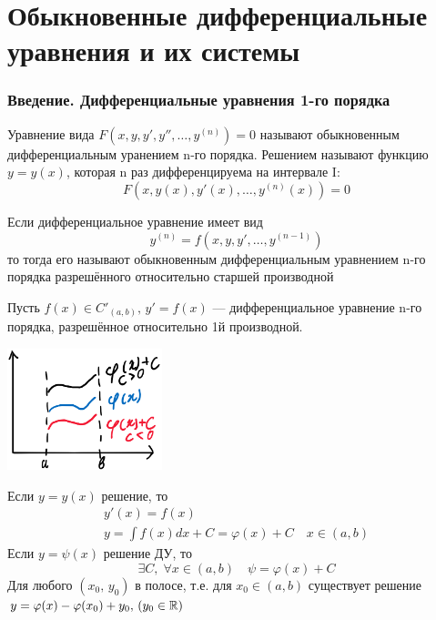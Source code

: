\author{Andrei Tkachuk}

\part{Обыкновенные дифференциальные уравнения и их системы}
\section{Введение. Дифференциальные уравнения 1-го порядка}

\begin{Def}
    Уравнение вида $F(x, y, y', y'', \dots, y^{(n)}) = 0$ называют обыкновенным дифференциальным уранением n-го порядка. Решением называют функцию $y = y(x)$, которая n раз дифференцируема на интервале I: 
    \[
        F(x, y(x), y'(x), \dots, y^{(n)}(x)) = 0
    \]
\end{Def}

\begin{Def}
    Если дифференциальное уравнение имеет вид
    \[
        y^{(n)} = f(x, y, y', \dots, y^{(n - 1)})
    \]
    то тогда его называют обыкновенным дифференциальным уравнением n-го порядка разрешённого относительно старшей производной 
\end{Def}

\begin{Example}[моделный]
    Пусть $f(x) \in C'_{(a, b)}, \, y' = f(x)$ --- дифференциальное уравнение n-го порядка, разрешённое относительно 1й производной.
    \begin{floatingfigure}[l]{50mm}
        \noindent
        \hfil
        \includegraphics[width=45mm]{pictures/2_1_1.png}
        \hfil
    \end{floatingfigure}
    Если $y = y(x)$ решение, то
    \begin{gather*}
        y'(x) = f(x)\\ 
        y = \int{f(x)dx} + C = \varphi(x) + C \quad x \in (a, b)
    \end{gather*}
    Если $y = \psi(x)$ решение ДУ, то 
    \[
        \exists C,\; \forall x \in (a, b) \quad \psi = \varphi(x) + C
    \]
    Для любого $(x_0,\, y_0)$ в полосе, т.е. для $x_0 \in (a, b)$ существует решение $y = \varphi(x) - \varphi(x_0) + y_0, \, (y_0 \in \mathbb{R})$
\end{Example}

